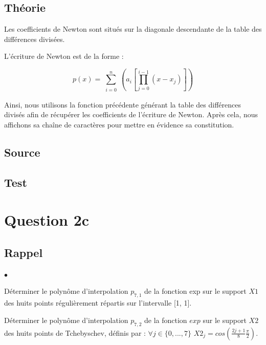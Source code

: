 \documentclass[a4paper,10pt]{report}
\begin{document}
\subsection*{Théorie}

Les coefficients de Newton sont situés sur la diagonale descendante de la table des différences divisées. 

L’écriture de Newton est de la forme :

\begin{equation}
p(x) = \sum_{\substack{i=0}}^{n} \left(a_{i}\left[\prod_{j=0}^{i-1}(x-x_{j})\right]\right)
\end{equation}

Ainsi, nous utilisons la fonction précédente générant la table des différences divisés afin de récupérer les coefficients de l’écriture de Newton. Après cela, nous affichons sa chaîne de caractères pour mettre en évidence sa constitution. 

\newpage
\subsection*{Source}

\begin{center}
%	
\end{center}

\subsection*{Test}

\begin{center}
%	
\end{center}

\section*{Question 2c}

\subsection*{Rappel}

\begin{list}{}{}
\item \begin{list}{$\bullet$}{}
\item Déterminer le polynôme d’interpolation $p_{7,1}$ de la fonction exp sur
le support $X1$ des huits points régulièrement répartis sur l’intervalle [1, 1].
\item Déterminer le polynôme d’interpolation $p_{7,2}$ de la fonction $exp$ sur le
support $X2$ des huits points de Tchebyschev, définis par : $\forall j \in \lbrace 0,...,7 \rbrace$  $X2_{j} = cos(\frac{2j+1}{8} \frac{\pi}{2}).$
\end{list}
\end{list}
\end{document}

